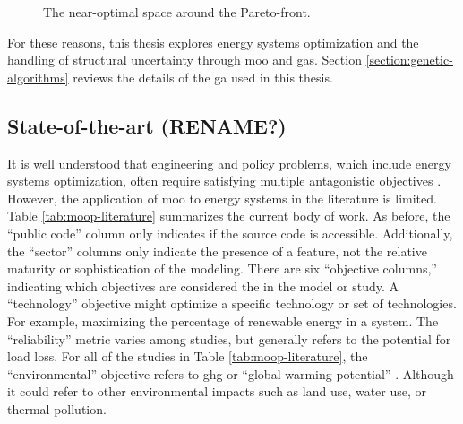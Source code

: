 \begin{figure}[H]
  \centering
  \resizebox{0.6\columnwidth}{!}{}
  \caption{The near-optimal space around the Pareto-front.}
  \label{fig:near-opt-pareto}
\end{figure}

For these reasons, this thesis explores energy systems optimization and the
handling of structural uncertainty through \ac{moo} and \acp{ga}. Section
\ref{section:genetic-algorithms} reviews the details of the \ac{ga} used in this
thesis.


\subsection{State-of-the-art (RENAME?)}
It is well understood that engineering and policy problems, which include energy
systems optimization, often require satisfying multiple antagonistic objectives
\cite{loughlin_genetic_2001,zechman_evolutionary_2004,
zechman_evolutionary_2013, chattopadhyay_need_2021}. However, the application of
\ac{moo} to energy systems in the literature is limited. Table
\ref{tab:moop-literature} summarizes the current body of work. As before, the
``public code'' column only indicates if the source code is accessible.
Additionally, the ``sector'' columns only indicate the presence of a feature,
not the relative maturity or sophistication of the modeling. There are six
``objective columns,'' indicating which objectives are considered the in the
model or study. A ``technology'' objective might optimize a specific technology
or set of technologies. For example, maximizing the percentage of renewable
energy in a system. The ``reliability'' metric varies among studies, but
generally refers to the potential for load loss. For all of the studies in Table
\ref{tab:moop-literature}, the ``environmental'' objective refers to \ac{ghg} or
``global warming potential'' \cite{de-leon_almaraz_deployment_2015}. Although it
could refer to other environmental impacts such as land use, water use, or
thermal pollution. 

